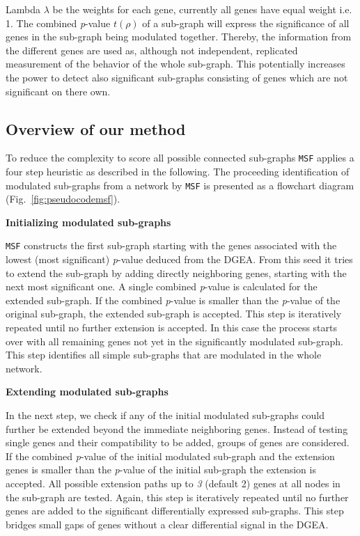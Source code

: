 \documentclass[10pt,a4paper,twocolumn]{article}
\begin{document}
	Lambda $\lambda$ be the weights for each gene, currently all genes have equal weight i.e. 1. The combined \textit{p}-value  $t(\rho)$ of a sub-graph will express the
	significance of all genes in the sub-graph being modulated
	together. Thereby, the information from the different genes are used as,
	although not independent, replicated measurement of the behavior of the
	whole sub-graph. This potentially increases the power to detect also
	significant sub-graphs consisting of genes which are not significant on
	there own.

	
	\subsection*{Overview of our method}
	
	To reduce the complexity to score all possible connected sub-graphs
	\texttt{MSF} applies a four step heuristic as described in the
	following. The proceeding identification of modulated sub-graphs from a
	network by \texttt{MSF} is presented as a flowchart diagram
	(Fig.~\ref{fig:pseudocodemsf}). \newline
	
	
	\textbf{Initializing modulated sub-graphs}
	
	\texttt{MSF} constructs the first sub-graph starting with the genes
	associated with the lowest (most significant) \textit{p}-value deduced from
	the DGEA. From this seed it tries to extend the sub-graph by adding directly
	neighboring genes, starting with the next most significant one. A single
	combined \textit{p}-value is calculated for the extended sub-graph.
	If the combined \textit{p}-value is smaller than the \textit{p}-value of
	the original sub-graph,
	the extended sub-graph is accepted. This step is
	iteratively repeated until no further extension is accepted. In this case
	the process starts over with all remaining genes not yet in the significantly
	modulated sub-graph. This step identifies all simple sub-graphs that
	are modulated in the whole network.\newline
	
	\textbf{Extending modulated sub-graphs}
	
	In the next step, we check if any of the initial modulated
        sub-graphs could further be extended beyond the immediate
          neighboring genes. Instead of testing single genes and
          their compatibility to be added, groups of genes are
          considered. If the combined \textit{p}-value of the
        initial modulated sub-graph and the extension genes is smaller
        than the \textit{p}-value of the initial sub-graph the
        extension is accepted. All possible extension paths up to
        \emph{3} (default 2) genes at all nodes in the sub-graph are
        tested. Again, this step is iteratively repeated until no
        further genes are added to the significant differentially
        expressed sub-graphs. This step bridges small gaps of genes
        without a clear differential signal in the DGEA.\newline
	
\end{document}
